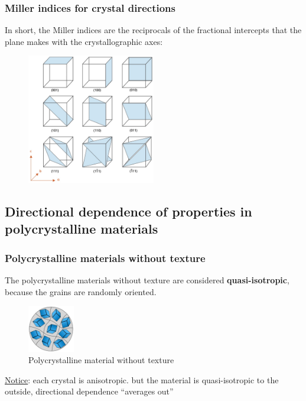 \documentclass{article}
\begin{document}
\newpage
\subsubsection{Miller indices for crystal directions}
In short, the Miller indices are the reciprocals of the fractional intercepts
that the plane makes with the crystallographic axes:
\begin{figure}[ht!]
  \centering
  \includegraphics[width=0.5\textwidth]{media/miller_indices.png}
\end{figure}

\subsection{Directional dependence of properties in polycrystalline materials}
\subsubsection{Polycrystalline materials without texture}
The polycrystalline materials without texture are considered \textbf{quasi-isotropic},
because the grains are randomly oriented.
\begin{figure}[ht!]
  \centering
  \includegraphics[width=0.1825\textwidth]{media/poly_notexture.png}
  \caption*{Polycrystalline material without texture}
\end{figure}

\underline{Notice}: each crystal is anisotropic. but the material is quasi-isotropic to the outside, directional
dependence ``averages out''
\end{document}
